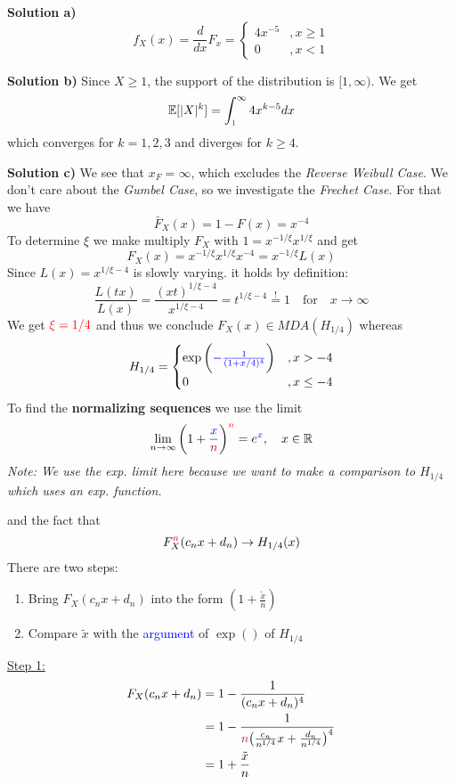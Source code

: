 \textbf{Solution a)}
\[
    f_X(x) = \frac{d}{dx}F_x = \begin{cases} 4x^{-5} &, x\geq 1 \\ 0 &, x < 1\end{cases}
\]

\textbf{Solution b)} Since $X \geq 1$, the support of the distribution is $[1,\infty)$. We get
\[
    \mathbb{E}[|X|^k] = \int_{\textcolor{red}{1}}^\infty 4x^{k-5} dx
\]
which converges for $k=1,2,3$ and diverges for $k\geq 4$.

\textbf{Solution c)} We see that $x_F = \infty$, which excludes the \textit{Reverse Weibull Case}. We don't care about the 
\textit{Gumbel Case}, so we investigate the \textit{Frechet Case}. For that we have
\[
    \bar{F}_X(x) = 1 - F(x) = x^{-4}
\]
To determine $\xi$ we make multiply $F_X$ with $1 = x^{-1/\xi}x^{1/\xi}$ and get\\
\[
    F_X(x) = x^{-1/\xi}x^{1/\xi}x^{-4} = x^{-1/\xi}L(x)
\]
Since $L(x) = x^{1/\xi - 4}$ is slowly varying. it holds by definition:\\
\[
    \frac{L(tx)}{L(x)} = \frac{(xt)^{1/\xi - 4}}{x^{1/\xi - 4}}
    = t^{1/\xi - 4} \overset{!}{=} 1 \quad \text{for} \quad x \to \infty
\]
We get $\textcolor{red}{\xi = 1/4}$ and thus we conclude $F_X(x) \in MDA(H_{1/4})$ whereas \\
\[
    H_{1/4} =
    \begin{cases}
        \exp\bigg(\textcolor{blue}{-\frac{1}{(1+x/4)^4}}\bigg) &, x > -4 \\
        0 &, x \leq -4
    \end{cases}
\]
To find the \textbf{normalizing sequences} we use the limit
\[
    \lim_{n\to\infty}\bigg(1 + \frac{\textcolor{blue}{x}}{\textcolor{purple}{n}}\bigg)^{\textcolor{red}{n}} = e^{\textcolor{blue}{x}}, \quad x\in\mathbb{R}
\]
\textit{Note: We use the exp. limit here because we want to make a comparison to $H_{1/4}$ which uses an exp. function.}

and the fact that
\[
    F_X^{\textcolor{red}{n}}(c_n x + d_n) \to H_{1/4}(x)
\]
There are two steps:
\begin{enumerate}
    \item Bring $F_X(c_n x + d_n)$ into the form $(1 + \frac{\tilde{x}}{n})$
    \item Compare $\tilde{x}$ with the \textcolor{blue}{argument} of $\exp()$ of $H_{1/4}$
\end{enumerate}

\underline{Step 1:}
\begin{align*}
    F_X (c_n x + d_n) &= 1 - \frac{1}{(c_n x + d_n)^4} \\
    &= 1 - \frac{1}{\textcolor{purple}{n}\big( \frac{c_n}{n^{1/4}}x + \frac{d_n}{n^{1/4}}\big)^4} \\
    &= 1 + \frac{\tilde{x}}{n}
\end{align*}

